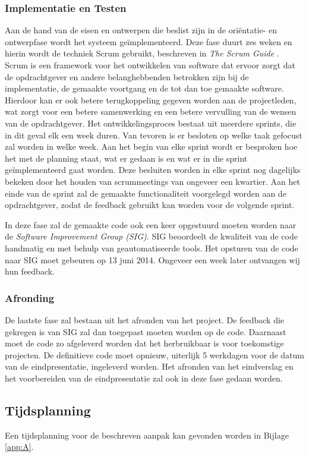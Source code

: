 \subsubsection{Implementatie en Testen}
\label{subsubsec:testen}
Aan de hand van de eisen en ontwerpen die beslist zijn in de ori\"entatie- en ontwerpfase wordt het systeem ge\"implementeerd. Deze fase duurt zes weken en hierin wordt de techniek Scrum gebruikt, beschreven in \emph{The Scrum Guide} \cite{schwaber2011}. Scrum is een framework voor het ontwikkelen van software dat ervoor zorgt dat de opdrachtgever en andere belanghebbenden betrokken zijn bij de implementatie, de gemaakte voortgang en de tot dan toe gemaakte software. Hierdoor kan er ook betere terugkoppeling gegeven worden aan de projectleden, wat zorgt voor een betere samenwerking en een betere vervulling van de wensen van de opdrachtgever. Het ontwikkelingsproces bestaat uit meerdere sprints, die in dit geval elk een week duren. Van tevoren is er besloten op welke taak gefocust zal worden in welke week. Aan het begin van elke sprint wordt er besproken hoe het met de planning staat, wat er gedaan is en wat er in die sprint ge\"implementeerd gaat worden. Deze besluiten worden in elke sprint nog dagelijks bekeken door het houden van scrummeetings van ongeveer een kwartier. Aan het einde van de sprint zal de gemaakte functionaliteit voorgelegd worden aan de opdrachtgever, zodat de feedback gebruikt kan worden voor de volgende sprint.

In deze fase zal de gemaakte code ook een keer opgestuurd moeten worden naar de \emph{Software Improvement Group (SIG)}. SIG beoordeelt de kwaliteit van de code handmatig en met behulp van geautomatiseerde tools. Het opsturen van de code naar SIG moet gebeuren op 13 juni 2014. Ongeveer een week later ontvangen wij hun feedback.

\subsubsection{Afronding}
De laatste fase zal bestaan uit het afronden van het project. De feedback die gekregen is van SIG zal dan toegepast moeten worden op de code. Daarnaast moet de code zo afgeleverd worden dat het herbruikbaar is voor toekomstige projecten. De definitieve code moet opnieuw, uiterlijk 5 werkdagen voor de datum van de eindpresentatie, ingeleverd worden. Het afronden van het eindverslag en het voorbereiden van de eindpresentatie zal ook in deze fase gedaan worden.

\subsection{Tijdsplanning}
Een tijdsplanning voor de beschreven aanpak kan gevonden worden in Bijlage \ref{app:A}.
